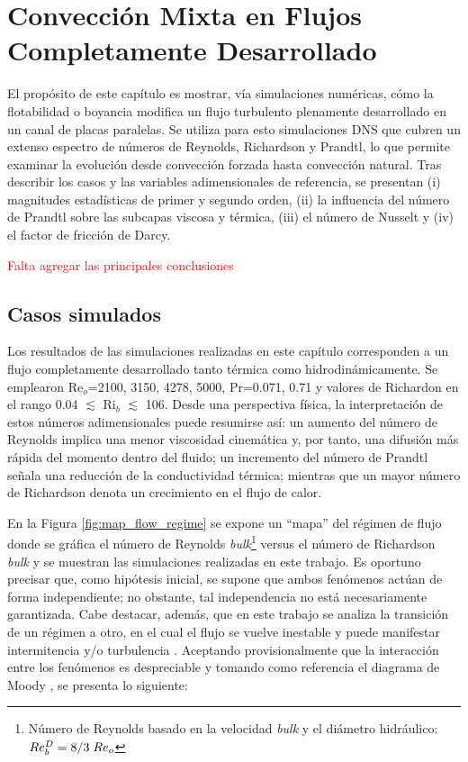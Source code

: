 \chapter{Convección Mixta en Flujos Completamente Desarrollado}


El propósito de este capítulo es mostrar, vía simulaciones numéricas, cómo la flotabilidad o boyancia modifica un flujo turbulento plenamente desarrollado en un canal de placas paralelas. Se utiliza para esto simulaciones DNS que cubren un extenso espectro de números de Reynolds, Richardson y Prandtl, lo que permite examinar la evolución desde convección forzada hasta convección natural. Tras describir los casos y las variables adimensionales de referencia, se presentan (i) magnitudes estadísticas de primer y segundo orden, (ii) la influencia del número de Prandtl sobre las subcapas viscosa y térmica, (iii) el número de Nusselt y (iv) el factor de fricción de Darcy.

\textcolor{red}{Falta agregar las principales conclusiones}

\newpage

\section{Casos simulados} 

Los resultados de las simulaciones realizadas en este capítulo corresponden a un flujo completamente desarrollado tanto térmica como hidrodinámicamente. Se emplearon Re$_o$=2100, 3150, 4278, 5000, Pr=0.071, 0.71 y valores de Richardon en el rango 0.04 $\lesssim$ Ri$_b$ $\lesssim$ 106. Desde una perspectiva física, la interpretación de estos números adimensionales puede resumirse así: un aumento del número de Reynolds implica una menor viscosidad cinemática y, por tanto, una difusión más rápida del momento dentro del fluido; un incremento del número de Prandtl señala una reducción de la conductividad térmica; mientras que un mayor número de Richardson denota un crecimiento en el flujo de calor.

En la Figura \ref{fig:map_flow_regime} se expone un ``mapa'' del régimen de flujo donde se gráfica el número de Reynolds \textit{bulk}\footnote{Número de Reynolds basado en la velocidad \textit{bulk} y el diámetro hidráulico: $Re^D_b = 8/3 \hspace*{1mm} Re_o$} versus el número de Richardson \textit{bulk} y se muestran las simulaciones realizadas en este trabajo. Es oportuno precisar que, como hipótesis inicial, se supone que ambos fenómenos actúan de forma independiente; no obstante, tal independencia no está necesariamente garantizada. Cabe destacar, además, que en este trabajo se analiza la transición de un régimen a otro, en el cual el flujo se vuelve inestable y puede manifestar intermitencia y/o turbulencia \cite{chen2003direct}. Aceptando provisionalmente que la interacción entre los fenómenos es despreciable y tomando como referencia el diagrama de Moody \cite{white}, se presenta lo siguiente:


